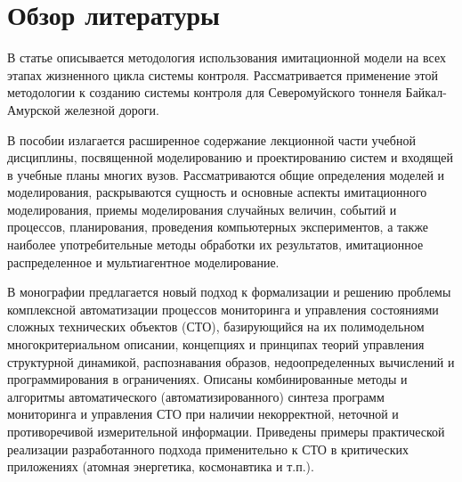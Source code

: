 \section{Обзор литературы}

В статье \cite{journal:vechisl_tech:2004_okolnischnikov} описывается методология использования
имитационной модели на всех этапах жизненного цикла системы контроля.
Рассматривается применение этой методологии к созданию системы контроля для
Северомуйского тоннеля Байкал-Амурской железной дороги.

В пособии \cite{book:Immitmodelsiste} излагается расширенное содержание лекционной части учебной
дисциплины, посвященной моделированию и проектированию систем и входящей в учебные планы многих вузов. Рассматриваются общие определения
моделей и моделирования, раскрываются сущность и основные аспекты имитационного моделирования, приемы моделирования случайных величин, событий
и процессов, планирования, проведения компьютерных экспериментов, а также
наиболее употребительные методы обработки их результатов, имитационное
распределенное и мультиагентное моделирование. 

В монографии \cite{book:OhtilevSokolovUsupov} предлагается новый подход к формализации и решению проблемы комплексной автоматизации процессов мониторинга и управления состояниями сложных технических объектов (СТО), базирующийся на их полимодельном многокритериальном описании, концепциях и принципах теорий управления структурной динамикой, распознавания образов, недоопределенных вычислений и программирования в ограничениях. Описаны комбинированные методы и алгоритмы автоматического (автоматизированного) синтеза программ мониторинга и управления СТО при наличии некорректной, неточной и противоречивой измерительной информации. Приведены примеры практической реализации разработанного подхода применительно к СТО в критических приложениях (атомная энергетика, космонавтика и т.п.).
